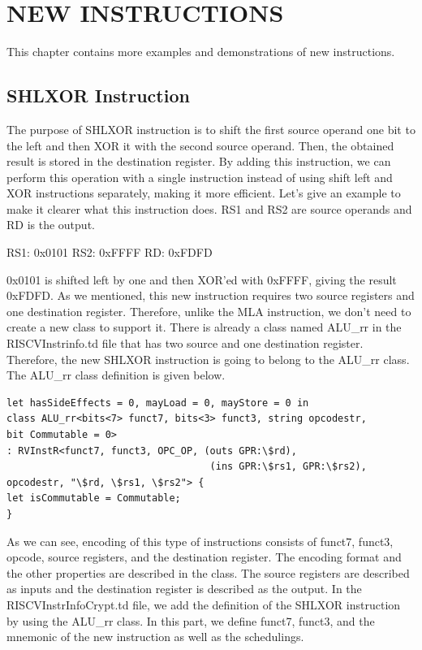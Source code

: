 \clearpage
\chapter{NEW INSTRUCTIONS}\label{Ch9}
This chapter contains more examples and demonstrations of new instructions.

\section{SHLXOR Instruction}\label{sec:shlxor}
The purpose of SHLXOR instruction is to shift the first source operand one bit to the left and then XOR it with the second source operand. Then, the obtained result is stored in the destination register. By adding this instruction, we can perform this operation with a single instruction instead of using shift left and XOR instructions separately, making it more efficient.
Let’s give an example to make it clearer what this instruction does. RS1 and RS2 are source operands and RD is the output.
\par
RS1: 0x0101     RS2: 0xFFFF     RD: 0xFDFD
\par
0x0101 is shifted left by one and then XOR’ed with 0xFFFF, giving the result 0xFDFD.
As we mentioned, this new instruction requires two source registers and one destination register. Therefore, unlike the MLA instruction, we don’t need to create a new class to support it. There is already a class named ALU\_rr in the RISCVInstrinfo.td file that has two source and one destination register. Therefore, the new SHLXOR instruction is going to belong to the ALU\_rr class. The ALU\_rr class definition is given below.

\begin{lstlisting}
let hasSideEffects = 0, mayLoad = 0, mayStore = 0 in
class ALU_rr<bits<7> funct7, bits<3> funct3, string opcodestr,
bit Commutable = 0>
: RVInstR<funct7, funct3, OPC_OP, (outs GPR:\$rd),
                                   (ins GPR:\$rs1, GPR:\$rs2),
opcodestr, "\$rd, \$rs1, \$rs2"> {
let isCommutable = Commutable;
}
\end{lstlisting}

As we can see, encoding of this type of instructions consists of funct7, funct3, opcode, source registers, and the destination register. The encoding format and the other properties are described in the class. The source registers are described as inputs and the destination register is described as the output.
In the RISCVInstrInfoCrypt.td file, we add the definition of the SHLXOR instruction by using the ALU\_rr class. In this part, we define funct7, funct3, and the mnemonic of the new instruction as well as the schedulings.

